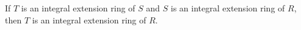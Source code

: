 If $T$ is an integral extension ring of $S$ and $S$ is an integral extension ring of $R$, then $T$ is an integral extension ring of $R$.
